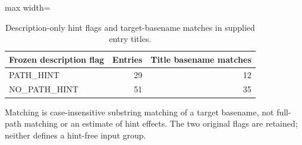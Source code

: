 \begin{table}[t]
\centering\small
\caption{Description-only hint flags and target-basename matches in supplied entry titles.}\label{tab:input-hints}
\begin{adjustbox}{max width=\textwidth}\begin{tabular}{lrr}
\toprule
Frozen description flag & Entries & Title basename matches \\
\midrule
PATH\_HINT & 29 & 12 \\
NO\_PATH\_HINT & 51 & 35 \\
\bottomrule
\end{tabular}\end{adjustbox}
\par\vspace{3pt}\begin{minipage}{\textwidth}\footnotesize Matching is case-insensitive substring matching of a target basename, not full-path matching or an estimate of hint effects. The two original flags are retained; neither defines a hint-free input group.\end{minipage}
\end{table}
